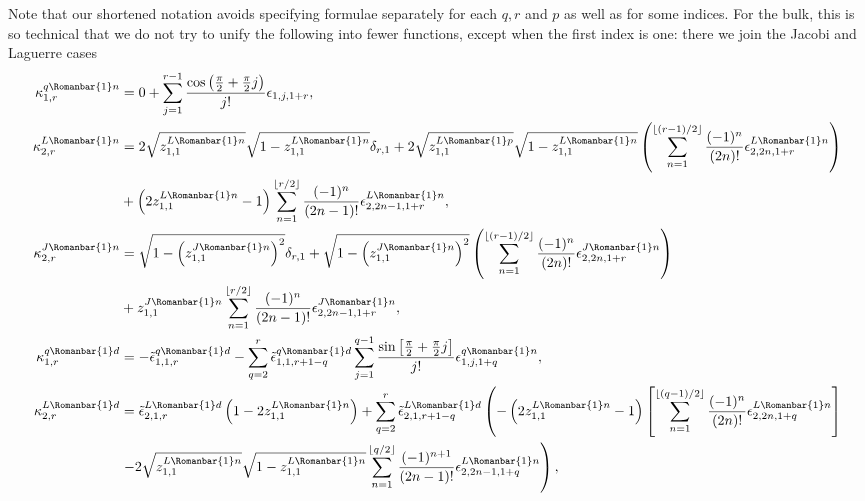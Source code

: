 \documentclass[11pt]{article}
\newcommand*{\Pc}[1]{{\color{blue}#1}}
\newcommand{\qg}{q}
\newcommand{\ql}{L}
\newcommand{\qj}{J}
\newcommand{\rg}{r}
\newcommand{\rb}{{\scriptsize \Romanbar{1}} }
\newcommand{\pg}{p}
\newcommand{\pn}{n}
\newcommand{\pd}{d}
\numberwithin{equation}{section}
\begin{document}
Note that our shortened notation avoids specifying formulae separately for each $\qg,\rg$ and $\pg$ as well as for some indices. For the bulk, this is so technical that we do not try to unify the following into fewer functions, except when the first index is one: there we join the Jacobi and Laguerre cases%
\begin{align}
	\kappa_{1,r}^{\qg\rb\pn} & = 0 + \sum_{j=1}^{r-1} \frac{\cos\left(\frac{\pi}{2} +\frac{\pi}{2} j \right)}{j!} \epsilon_{1, j, 1+r}, \\ 
	\kappa_{2,r}^{\ql\rb\pn} & = 2\sqrt{z_{1,1}^{\ql\rb\pn}}\sqrt{1-z_{1,1}^{\ql\rb\pn}} \delta_{r,1} + 2\sqrt{z_{1,1}^{\ql\rb\pg}}\sqrt{1-z_{1,1}^{\ql\rb\pn} }\left(\sum_{n=1}^{\lfloor (r-1)/2 \rfloor} \frac{(-1)^n }{(2n)!} \epsilon_{2, 2n, 1+r}^{\ql\rb\pn} \right) \\ %
	& + \left(2z_{1,1}^{\ql\rb\pn}-1\right) \sum_{n=1}^{\lfloor r/2 \rfloor} \frac{(-1)^{n} }{(2n-1)!} \epsilon_{2, 2n-1, 1+r}^{\ql\rb\pn}, \\ %
	\kappa_{2,r}^{\qj\rb\pn} & = \sqrt{1 -\left(z_{1,1}^{\qj\rb\pn}\right)^2} \delta_{r,1} + \sqrt{1-\left(z_{1,1}^{\qj\rb\pn}\right)^2 }\left(\sum_{n=1}^{\lfloor (r-1)/2 \rfloor} \frac{(-1)^n }{(2n)!} \epsilon_{2, 2n, 1+r}^{\qj\rb\pn} \right) \\ 
	& + z_{1,1}^{\qj\rb\pn} \sum_{n=1}^{\lfloor r/2 \rfloor} \frac{(-1)^{n} }{(2n-1)!} \epsilon_{2, 2n-1, 1+r}^{\qj\rb\pn}, \\ %
	\kappa_{1, r}^{\qg\rb\pd} & = - \tilde{\epsilon}_{1, 1, r}^{\qg\rb\pd}  - \sum_{q=2}^{r} \tilde{\epsilon}_{1, 1, r+1-q}^{\qg\rb\pd}  \sum_{j=1}^{q-1} \frac{\sin\left[\frac{\pi}{2} +\frac{\pi}{2} j \right] }{j!} \epsilon_{1, j, 1+q}^{\qg\rb\pn}, \\
	\kappa_{2, r}^{\ql\rb\pd} & = \tilde{\epsilon}_{2, 1, r}^{\ql\rb\pd}  \left(1-2z_{1,1}^{\ql\rb\pn}\right) +  \sum_{q=2}^{r} \tilde{\epsilon}_{2, 1, r+1-q}^{\ql\rb\pd} \left(  - \left(2z_{1,1}^{\ql\rb\pn} -1\right) \left[\sum_{n=1}^{\lfloor (q-1)/2 \rfloor} \frac{(-1)^n}{(2n)!} \epsilon_{2, 2n, 1+q}^{\ql\rb\pn} \right] \right. \\ %
	& \left. - 2\sqrt{z_{1,1}^{\ql\rb\pn} }\sqrt{1-z_{1,1}^{\ql\rb\pn} } \sum_{n=1}^{\lfloor q/2 \rfloor} \frac{(-1)^{n+1}}{(2n-1)!} \epsilon_{2, 2n-1, 1+q}^{\ql\rb\pn} \right), \\ %

\end{align}
\end{document}
